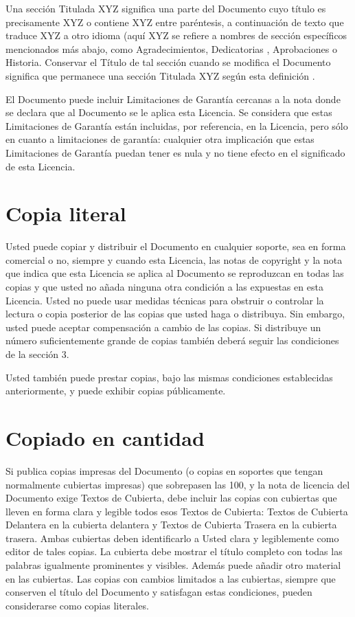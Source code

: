 Una sección Titulada XYZ significa una parte del Documento cuyo título
es precisamente XYZ o contiene XYZ entre paréntesis, a continuación de
texto que traduce XYZ a otro idioma (aquí XYZ se refiere a nombres de
sección específicos mencionados más abajo, como Agradecimientos,
Dedicatorias , Aprobaciones o Historia. Conservar el Título de tal
sección cuando se modifica el Documento significa que permanece una
sección Titulada XYZ según esta definición .

El Documento puede incluir Limitaciones de Garantía cercanas a la nota
donde se declara que al Documento se le aplica esta Licencia. Se
considera que estas Limitaciones de Garantía están incluidas, por
referencia, en la Licencia, pero sólo en cuanto a limitaciones de
garantía: cualquier otra implicación que estas Limitaciones de
Garantía puedan tener es nula y no tiene efecto en el significado de
esta Licencia.


\section{Copia literal}

Usted puede copiar y distribuir el Documento en cualquier soporte, sea
en forma comercial o no, siempre y cuando esta Licencia, las notas de
copyright y la nota que indica que esta Licencia se aplica al
Documento se reproduzcan en todas las copias y que usted no añada
ninguna otra condición a las expuestas en esta Licencia. Usted no
puede usar medidas técnicas para obstruir o controlar la lectura o
copia posterior de las copias que usted haga o distribuya. Sin
embargo, usted puede aceptar compensación a cambio de las copias. Si
distribuye un número suficientemente grande de copias también deberá
seguir las condiciones de la sección 3.

Usted también puede prestar copias, bajo las mismas condiciones
establecidas anteriormente, y puede exhibir copias públicamente.



\section{Copiado en cantidad}

Si publica copias impresas del Documento (o copias en soportes que
tengan normalmente cubiertas impresas) que sobrepasen las 100, y la
nota de licencia del Documento exige Textos de Cubierta, debe incluir
las copias con cubiertas que lleven en forma clara y legible todos
esos Textos de Cubierta: Textos de Cubierta Delantera en la cubierta
delantera y Textos de Cubierta Trasera en la cubierta trasera. Ambas
cubiertas deben identificarlo a Usted clara y legiblemente como editor
de tales copias. La cubierta debe mostrar el título completo con todas
las palabras igualmente prominentes y visibles. Además puede añadir
otro material en las cubiertas. Las copias con cambios limitados a las
cubiertas, siempre que conserven el título del Documento y satisfagan
estas condiciones, pueden considerarse como copias literales.

